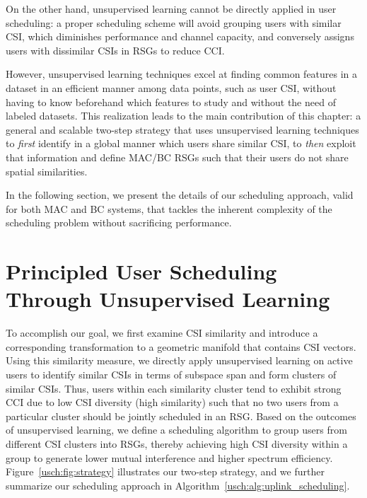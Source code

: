 On the other hand, unsupervised learning cannot be directly applied in user scheduling: a proper scheduling scheme will avoid grouping users with similar CSI, which diminishes performance and channel capacity, and conversely assigns users with dissimilar CSIs in RSGs to reduce CCI.

However, unsupervised learning techniques excel at finding common features in a dataset in an efficient manner among data points, such as user CSI, without having to know beforehand which features to study and without the need of labeled datasets. This realization leads to the main contribution of this chapter: a general and scalable two-step strategy that uses unsupervised learning techniques to \emph{first} identify in a global manner which users share similar CSI, to \emph{then} exploit that information and define MAC/BC RSGs such that their users do not share spatial similarities. 

In the following section, we present the details of our scheduling approach, valid for both MAC and BC systems, that tackles the inherent complexity of the scheduling problem without sacrificing performance. 


\section{Principled User Scheduling Through Unsupervised Learning} \label{usch:sec:strategy}

To accomplish our goal, we first examine CSI similarity and introduce a corresponding transformation to a geometric manifold that contains CSI vectors. 
Using this similarity measure, we directly apply unsupervised learning on active users to identify similar CSIs in terms of subspace span and form clusters of similar CSIs. 
Thus, users within each similarity cluster tend to exhibit strong CCI due to low CSI diversity (high similarity) such that no two users from a particular cluster should be jointly scheduled in an RSG. 
Based on the outcomes of unsupervised learning, we define a scheduling algorithm to group users from different CSI clusters into RSGs, thereby achieving high CSI diversity within a group to generate lower mutual interference and higher spectrum efficiency.
Figure~\ref{usch:fig:strategy} illustrates our two-step strategy, and we further summarize our scheduling approach in Algorithm~\ref{usch:alg:uplink_scheduling}.

